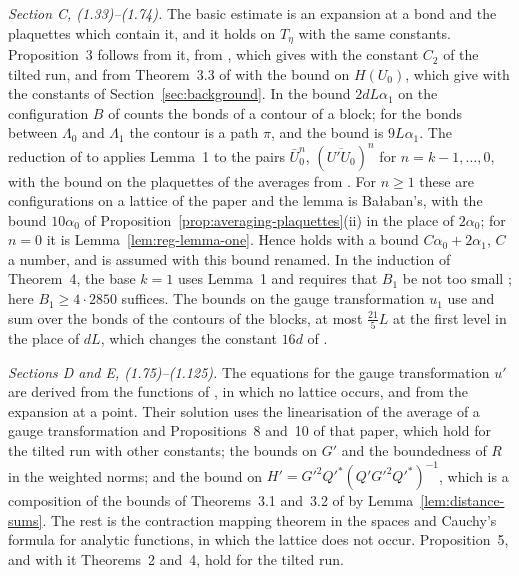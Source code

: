 \documentclass[11pt]{preprint}
\numberwithin{equation}{section}
\theoremstyle{definition}
\theoremstyle{remark}
\theoremstyle{plain}
\begin{document}
\emph{Section C, (1.33)--(1.74).} The basic estimate \cite[(1.43)--(1.54)]{BalabanREG} is an expansion at a bond and the plaquettes which contain it, and it holds on $T_\eta$ with the same constants. Proposition~3 follows from it, from \cite[Proposition~4]{BalabanAVG}, which gives \cite[(1.56)]{BalabanREG} with the constant $C_2$ of the tilted run, and from Theorem~3.3 of \cite{BalabanPBG} with the bound \cite[(3.133)]{BalabanPBG} on $H(U_0)$, which give \cite[(1.59)]{BalabanREG} with the constants of Section~\ref{sec:background}. In \cite[(1.37)]{BalabanREG} the bound $2dL\alpha_1$ on the configuration $B$ of \cite[(1.31)]{BalabanREG} counts the bonds of a contour of a block; for the bonds between $\Lambda_0$ and $\Lambda_1$ the contour is a path $\pi$, and the bound is $9L\alpha_1$. The reduction of \cite[(1.35)]{BalabanREG} to \cite[(1.66)]{BalabanREG} applies Lemma~1 to the pairs $\bar U_0^n$, $(\overline{U'U_0})^n$ for $n = k - 1, \dots, 0$, with the bound on the plaquettes of the averages from \cite[Proposition~2]{BalabanAVG}. For $n \geq 1$ these are configurations on a lattice of the paper and the lemma is Ba{\l}aban's, with the bound $10\alpha_0$ of Proposition~\ref{prop:averaging-plaquettes}(ii) in the place of $2\alpha_0$; for $n = 0$ it is Lemma~\ref{lem:reg-lemma-one}. Hence \cite[(1.65)]{BalabanREG} holds with a bound $C\alpha_0 + 2\alpha_1$, $C$ a number, and \cite[(1.66)]{BalabanREG} is assumed with this bound renamed. In the induction of Theorem~4, the base $k = 1$ uses Lemma~1 and requires that $B_1$ be not too small \cite[p.~89]{BalabanREG}; here $B_1 \geq 4 \cdot 2850$ suffices. The bounds \cite[(1.70)--(1.74)]{BalabanREG} on the gauge transformation $u_1$ use \cite[(105), (106), (108), (130)]{BalabanAVG} and sum over the bonds of the contours of the blocks, at most $\frac{21}{5}L$ at the first level in the place of $dL$, which changes the constant $16d$ of \cite[(1.72)]{BalabanREG}.

\emph{Sections D and E, (1.75)--(1.125).} The equations for the gauge transformation $u'$ are derived from the functions of \cite[Section~A]{BalabanAVG}, in which no lattice occurs, and from the expansion \cite[(1.86)--(1.89)]{BalabanREG} at a point. Their solution uses the linearisation \cite[(213), (214)]{BalabanAVG} of the average of a gauge transformation and Propositions~8 and~10 of that paper, which hold for the tilted run with other constants; the bounds \cite[(3.47)]{BalabanPBG} on $G'$ and the boundedness of $R$ in the weighted norms; and the bound \cite[(1.92)]{BalabanREG} on $H' = G'^2Q'^*(Q'G'^2Q'^*)^{-1}$, which is a composition of the bounds of Theorems~3.1 and~3.2 of \cite{BalabanPBG} by Lemma~\ref{lem:distance-sums}. The rest is the contraction mapping theorem in the spaces \cite[(1.102), (1.119)]{BalabanREG} and Cauchy's formula for analytic functions, in which the lattice does not occur. Proposition~5, and with it Theorems~2 and~4, hold for the tilted run.
\end{document}
